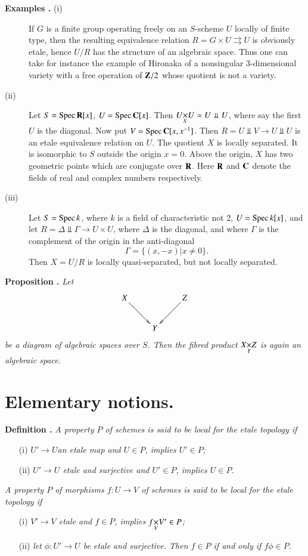 \noindent
\begin{description}
\item[{\bf Examples .\label{art02-exam1.7}} {\rm(i)}]
If $G$ is a finite group operating freely on an $S$-scheme $U$ locally of finite type, then the resulting equivalence relation $R=G\times U\rightrightarrows U$ is obviously etale, hence $U/R$ has the structure of an algebraic space. Thus one can take for instance the example of Hironaka \cite{art02-key16} of a nonsingular 3-dimensional variety with a free operation of $\mathbf{Z}/2$ whose quotient is not a variety.

\item[{\rm(ii)}] Let $S=\operatorname{Spec} \mathbf{R} [x]$, $U=\operatorname{Spec} \mathbf{C}[x]$. Then $\fprod{U}{U}{S}\approx U\Perp U$, where say the first $U$ is the diagonal. Now put $V=\operatorname{Spec} \mathbf{C}[x,x^{-1}]$. Then $R=U\Perp V\to U\Perp U$ is an etale equivalence relation on $U$. The quotient $X$ is locally separated. It is isomorphic to $S$ outside the origin $x=0$. Above the origin, $X$ has two geometric points which are conjugate over $\mathbf{R}$. Here $\mathbf{R}$ and $\mathbf{C}$ denote the fields of real and complex numbers respectively.

\item[{\rm(iii)}] Let $S=\operatorname{Spec} k$, where $k$ is a field of characteristic not 2, $U=\operatorname{Spec} k[x]$, and let $R=\Delta \Perp \Gamma\to U\times U$, where $\Delta$ is the diagonal, and where $\Gamma$ is the complement of the origin in the anti-diagonal
$$
\Gamma=\{(x,-x)|x\neq 0\}.
$$
Then $X=U/R$ is locally quasi-separated, but not locally separated.
\end{description}

\noindent
{\bf Proposition .\label{art02-prop1.8}}
{\em Let}
\[
\xymatrix{
X\ar[dr] & & Z\ar[dl]\\
 & Y &
}
\]
{\em be a diagram of algebraic spaces over $S$. Then the fibred product $\fprod{X}{Z}{Y}$ is again an algebraic space.}

\section{Elementary notions.}\label{art02-sec2}

\noindent
{\bf Definition .\label{art02-defi2.1}}
{\em A property $P$ of schemes is said to be local for the etale topology if}
\begin{itemize}
\item[\rm(i)] {\em $U'\to U$\pageoriginale an etale map and $U\in P$, implies $U'\in P$;}

\item[\rm(ii)] {\em $U'\to U$ etale and surjective and $U'\in P$, implies $U\in P$.}
\end{itemize}
{\em A property $P$ of morphisms $f:U\to V$ of schemes is said to be local for the etale topology if}
\begin{itemize}
\item[\rm(i)] {\em $V'\to V$ etale and $f\in P$, implies $\fprod{f}{V'}{V}\in P$;}

\item[\rm(ii)] {\em let $\phi:U'\to U$ be etale and surjective. Then $f\in P$ if and only if $f\phi\in P$.}
\end{itemize}

